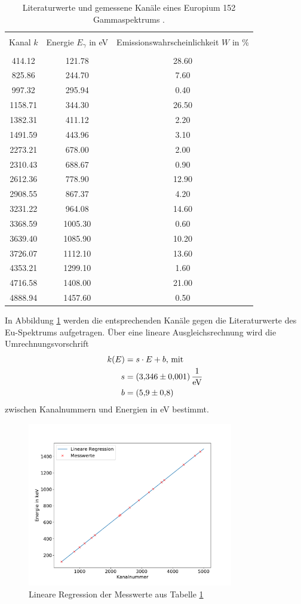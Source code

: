 \begin{table}
\centering
\caption{Literaturwerte und gemessene Kanäle eines Europium 152 Gammaspektrums \cite{sample}.}
\begin{tabular}{c c c}
\hline \\
Kanal $k$ &Energie $E_\gamma$ in eV & Emissionswahrscheinlichkeit $W$ in \% \\
\hline \\
414.12 & 121.78 & 28.60 \\ 825.86 & 244.70 & 7.60 \\ 997.32 & 295.94 & 0.40 \\ 1158.71 & 344.30 & 26.50 \\ 1382.31 & 411.12 & 2.20 \\ 1491.59 & 443.96 & 3.10 \\ 2273.21 & 678.00 & 2.00 \\ 2310.43 & 688.67 & 0.90 \\ 2612.36 & 778.90 & 12.90 \\ 2908.55 & 867.37 & 4.20 \\ 3231.22 & 964.08 & 14.60 \\ 3368.59 & 1005.30 & 0.60 \\ 3639.40 & 1085.90 & 10.20 \\ 3726.07 & 1112.10 & 13.60 \\ 4353.21 & 1299.10 & 1.60 \\ 4716.58 & 1408.00 & 21.00 \\ 4888.94 & 1457.60 & 0.50 \\ 
\hline
\end{tabular}
\label{tab:atab1}
\end{table}
In Abbildung \ref{fig:Kalibrierung} werden die entsprechenden Kanäle gegen die Literaturwerte des Eu-Spektrums aufgetragen. 
Über eine lineare Ausgleichsrechnung wird die Umrechnungsvorschrift
\begin{align*}
k(E) &= s \cdot E + b \text{, mit}\\
  s &= \SI{3.346+-0.001}{\per\electronvolt}\\
  b &= \SI{ 5.9+-0.8}{}
\end{align*}
zwischen Kanalnummern und Energien in eV bestimmt.
\begin{figure}
\centering
\includegraphics[width=0.8\textwidth]{python/plots/kalibrierung.pdf}
\caption{Lineare Regression der Messwerte aus Tabelle \ref{tab:atab1}}
\label{fig:Kalibrierung}
\end{figure}
